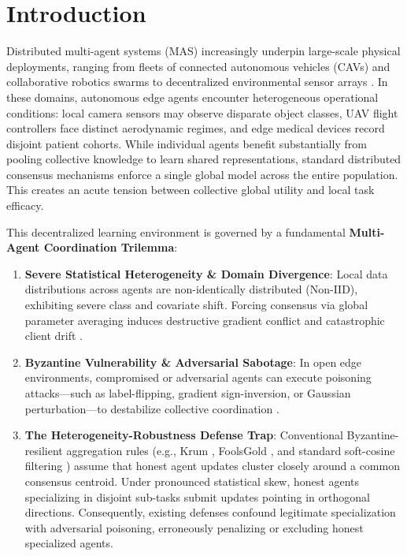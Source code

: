 \documentclass[sigconf]{acmart}
\begin{document}
\maketitle

\section{Introduction}

Distributed multi-agent systems (MAS) increasingly underpin large-scale physical deployments, ranging from fleets of connected autonomous vehicles (CAVs) and collaborative robotics swarms to decentralized environmental sensor arrays \cite{mcmahan2017communication, sabater2002regret}. In these domains, autonomous edge agents encounter heterogeneous operational conditions: local camera sensors may observe disparate object classes, UAV flight controllers face distinct aerodynamic regimes, and edge medical devices record disjoint patient cohorts. While individual agents benefit substantially from pooling collective knowledge to learn shared representations, standard distributed consensus mechanisms enforce a single global model across the entire population. This creates an acute tension between collective global utility and local task efficacy.

This decentralized learning environment is governed by a fundamental \textbf{Multi-Agent Coordination Trilemma}:
\begin{enumerate}
    \item \textbf{Severe Statistical Heterogeneity \& Domain Divergence}: Local data distributions across agents are non-identically distributed (Non-IID), exhibiting severe class and covariate shift. Forcing consensus via global parameter averaging induces destructive gradient conflict and catastrophic client drift \cite{karimireddy2020scaffold, sattler2020clustered}.
    \item \textbf{Byzantine Vulnerability \& Adversarial Sabotage}: In open edge environments, compromised or adversarial agents can execute poisoning attacks---such as label-flipping, gradient sign-inversion, or Gaussian perturbation---to destabilize collective coordination \cite{blanchard2017machine, yin2018byzantine, sun2019can}.
    \item \textbf{The Heterogeneity-Robustness Defense Trap}: Conventional Byzantine-resilient aggregation rules (e.g., Krum \cite{blanchard2017machine}, FoolsGold \cite{fung2020mitigating}, and standard soft-cosine filtering \cite{sun2019can}) assume that honest agent updates cluster closely around a common consensus centroid. Under pronounced statistical skew, honest agents specializing in disjoint sub-tasks submit updates pointing in orthogonal directions. Consequently, existing defenses confound legitimate specialization with adversarial poisoning, erroneously penalizing or excluding honest specialized agents.
\end{enumerate}
\end{document}
